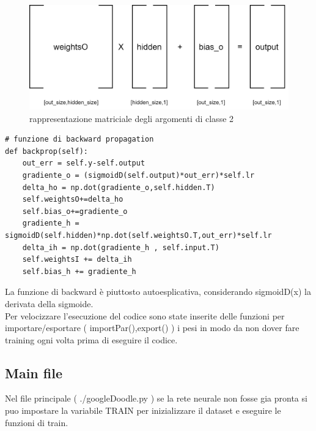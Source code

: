 \documentclass[12pt]{article}
\begin{document}
\begin{figure}[h!]
	\centering
	\includegraphics[width=10 cm]{resources/output.png}
	\caption{rappresentazione matriciale degli argomenti di classe 2}
	\label{fig:output}
\end{figure}
\newpage
\begin{lstlisting}[language=myPython]
# funzione di backward propagation
def backprop(self):
	out_err = self.y-self.output
	gradiente_o = (sigmoidD(self.output)*out_err)*self.lr
	delta_ho = np.dot(gradiente_o,self.hidden.T)
	self.weightsO+=delta_ho
	self.bias_o+=gradiente_o
	gradiente_h = sigmoidD(self.hidden)*np.dot(self.weightsO.T,out_err)*self.lr
	delta_ih = np.dot(gradiente_h , self.input.T)
	self.weightsI += delta_ih
	self.bias_h += gradiente_h
\end{lstlisting}
La funzione di backward è piuttosto autoesplicativa, considerando sigmoidD(x) la derivata della sigmoide.\\
Per velocizzare l'esecuzione del codice sono state inserite delle funzioni per importare/esportare ( importPar(),export() ) i pesi in modo da non dover fare training ogni volta prima di eseguire il codice.
\newpage
\subsection{Main file}
Nel file principale ( ./googleDoodle.py ) se la rete neurale non fosse gia pronta si puo impostare la variabile TRAIN per inizializzare il dataset e eseguire le funzioni di train.
\end{document}
